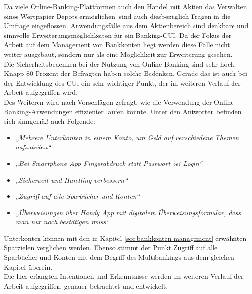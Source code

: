 Da viele Online-Banking-Plattformen auch den Handel mit Aktien \bzw das Verwalten eines Wertpapier Depots ermöglichen, sind auch diesbezüglich Fragen in die Umfrage eingeflossen. Anwendungsfälle aus dem Aktienbereich sind denkbare und sinnvolle Erweiterungsmöglichkeiten für ein Banking-\ac{CUI}. Da der Fokus der Arbeit auf dem Management von Bankkonten liegt werden diese Fälle nicht weiter ausgebaut, sondern nur als eine Möglichkeit zur Erweiterung gesehen.\\
Die Sicherheitsbedenken bei der Nutzung von Online-Banking sind sehr hoch. Knapp 80 Prozent der Befragten haben solche Bedenken. Gerade das ist auch bei der Entwicklung des \ac{CUI} ein sehr wichtiger Punkt, der im weiteren Verlauf der Arbeit aufgegriffen wird.\\
Des Weiteren wird nach Vorschlägen gefragt, wie die Verwendung der Online-Banking-Anwendungen effizienter laufen könnte. Unter den Antworten befinden sich sinngemäß auch Folgende:

\begin{itemize}
    \item\textit{„Mehrere Unterkonten in einem Konto, um Geld auf verschiedene Themen aufzuteilen“}
    \item\textit{„Bei Smartphone App Fingerabdruck statt Passwort bei Login“}
    \item\textit{„Sicherheit und Handling verbessern“}
    \item\textit{„Zugriff auf alle Sparbücher und Konten“}
    \item\textit{„Überweisungen über Handy App mit digitalem Überweisungsformular, dass man nur noch bestätigen muss“}
\end{itemize}

Unterkonten können mit den in Kapitel \ref{sec:bankkonten-management} erwähnten Sparzielen verglichen werden. Ebenso stimmt der Punkt Zugriff auf alle Sparbücher und Konten mit dem Begriff des Multibankings aus dem gleichen Kapitel überein.\\
Die hier erlangten Intentionen und Erkenntnisse werden im weiteren Verlauf der Arbeit aufgegriffen, genauer betrachtet und entwickelt.

